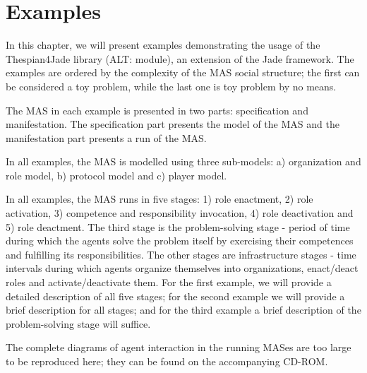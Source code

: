 
\chapter{Examples}

In this chapter, we will present examples demonstrating the usage of the Thespian4Jade library (ALT: module), an extension of the Jade framework.
The examples are ordered by the complexity of the MAS social structure; the first can be considered a toy problem, while the last one is toy problem by no means.

The MAS in each example is presented in two parts: specification and manifestation.
The specification part presents the model of the MAS and the manifestation part presents a run of the MAS.

In all examples, the MAS is modelled using three sub-models: a) organization and role model, b) protocol model and c) player model.

In all examples, the MAS runs in five stages: 1) role enactment, 2) role activation, 3) competence and responsibility invocation, 4) role deactivation and 5) role deactment.
The third stage is the problem-solving stage - period of time during which the agents solve the problem itself by exercising their competences and fulfilling its responsibilities.
The other stages are infrastructure stages - time intervals during which agents organize themselves into organizations, enact/deact roles and activate/deactivate them.
For the first example, we will provide a detailed description of all five stages; for the second example we will provide a brief description for all stages; and for the third example a brief description of the problem-solving stage will suffice.

The complete diagrams of agent interaction in the running MASes are too large to be reproduced here; they can be found on the accompanying CD-ROM. 





